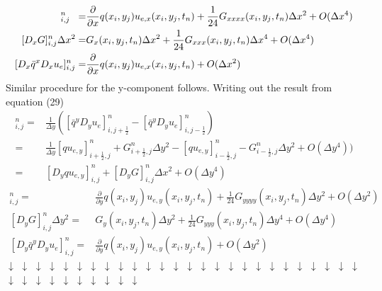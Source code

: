 \documentclass[twoside]{article}
\begin{document}
\begin{align*}
[D_{x}qu_{e,x}]_{i,j}^{n} \hspace{2mm} =& \frac{\partial}{\partial x}q(x_{i},y_{j})u_{e,x}(x_{i},y_{j},t_{n})+\frac{1}{24}G_{xxxx}(x_{i},y_{j},t_{n})\Delta x^{2}+O(\Delta x^{4}) \\
[D_{x}G]_{i,j}^{n}\Delta x^{2} =& G_{x}(x_{i},y_{j},t_{n})\Delta x^{2}+\frac{1}{24}G_{xxx}(x_{i},y_{j},t_{n})\Delta x^{4}+O(\Delta x^{4}) \\
[D_{x}\bar{q}^{x}D_{x}u_{e}]_{i,j}^{n} =& \frac{\partial}{\partial x}q(x_{i},y_{j})u_{e,x}(x_{i},y_{j},t_{n})+O(\Delta x^{2})
\end{align*}
Similar procedure for the y-component follows. Writing out the result from
equation (29)
\begin{align*}
[D_{y}\bar{q}^{y}D_{y}u_{y}]_{i,j}^{n} =& \frac{1}{\Delta y}\left([\bar{q}^{y}D_{y}u_{e}]_{i,j+\frac{1}{2}}^{n}-[\bar{q}^{y}D_{y}u_{e}]_{i,j-\frac{1}{2}}^{n}\right) \\
=& \frac{1}{\Delta y}[qu_{e,y}]_{i+\frac{1}{2},j}^{n}+G_{i+\frac{1}{2},j}^{n}\Delta y^{2}-[qu_{e,y}]_{i-\frac{1}{2},j}^{n}-G_{i-\frac{1}{2},j}^{n}\Delta y^{2}+O(\Delta y^{4})) \\
=& [D_{y}qu_{e,y}]_{i,j}^{n}+[D_{y}G]_{i,j}^{n}\Delta x^{2}+O(\Delta y^{4})
\end{align*}
\begin{align*}
[D_{y}qu_{e,y}]_{i,j}^{n} =& \frac{\partial}{\partial y}q(x_{i},y_{j})u_{e,y}(x_{i},y_{j},t_{n})+\frac{1}{24}G_{yyyy}(x_{i},y_{j},t_{n})\Delta y^{2}+O(\Delta y^{2}) \\
[D_{y}G]_{i,j}^{n}\Delta y^{2} =& G_{y}(x_{i},y_{j},t_{n})\Delta y^{2}+\frac{1}{24}G_{yyy}(x_{i},y_{j},t_{n})\Delta y^{4}+O(\Delta y^{4}) \\
[D_{y}\bar{q}^{y}D_{y}u_{e}]_{i,j}^{n} =& \frac{\partial}{\partial y}q(x_{i},y_{j})u_{e,y}(x_{i},y_{j},t_{n})+O(\Delta y^{2})
\end{align*}
$\downarrow$ $\downarrow$ $\downarrow$ $\downarrow$ $\downarrow$ $\downarrow$ $\downarrow$ $\downarrow$ $\downarrow$ $\downarrow$ $\downarrow$ $\downarrow$
$\downarrow$ $\downarrow$ $\downarrow$ $\downarrow$ $\downarrow$ $\downarrow$
$\downarrow$ $\downarrow$ $\downarrow$ $\downarrow$ $\downarrow$ $\downarrow$
$\downarrow$ $\downarrow$ $\downarrow$ $\downarrow$ $\downarrow$ $\downarrow$
$\downarrow$ $\downarrow$ $\downarrow$ $\downarrow$ $\downarrow$ $\downarrow$
\end{document}
